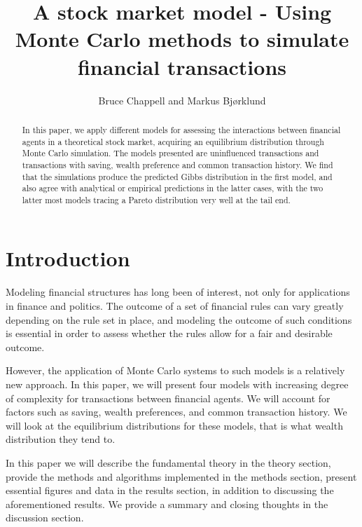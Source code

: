 \documentclass{emulateapj}
\begin{document}
\title{A stock market model - Using Monte Carlo methods to simulate financial transactions}

\author{Bruce Chappell and Markus Bjørklund}



\begin{abstract}
In this paper, we apply different models for assessing the interactions between financial agents in a theoretical stock market, acquiring an equilibrium distribution through Monte Carlo simulation. The models presented are uninfluenced transactions and transactions with saving, wealth preference and common transaction history. We find that the simulations produce the predicted Gibbs distribution in the first model, and also agree with analytical or empirical predictions in the latter cases, with the two latter most models tracing a Pareto distribution very well at the tail end. 

\end{abstract}

\section{Introduction}
\label{sec:introduction}
Modeling financial structures has long been of interest, not only for applications in finance and politics. The outcome of a set of financial rules can vary greatly depending on the rule set in place, and modeling the outcome of such conditions is essential in order to assess whether the rules allow for a fair and desirable outcome.

However, the application of Monte Carlo systems to such models is a relatively new approach. In this paper, we will present four models with increasing degree of complexity for transactions between financial agents. We will account for factors such as saving, wealth preferences, and common transaction history. We will look at the equilibrium distributions for these models, that is what wealth distribution they tend to.

In this paper we will describe the fundamental theory in the theory section, provide the methods and algorithms implemented in the methods section, present essential figures and data in the results section, in addition to discussing the aforementioned results. We provide a summary and closing thoughts in the discussion section.
\end{document}
